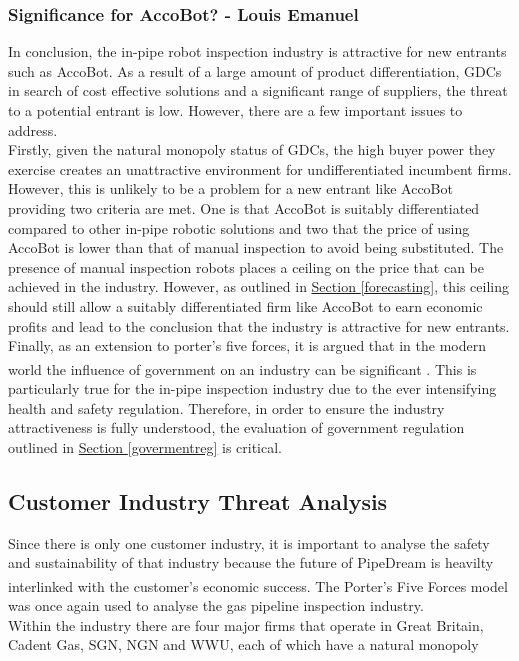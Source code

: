\documentclass[11pt]{article}		%
\newcommand{\supercite}[1]{\textsuperscript{\cite{#1}}}		%
\newcommand{\sectref}[1]{\hyperref[#1]{Section \ref*{#1}}}     %
\begin{document}
			\subsubsection{Significance for AccoBot? - Louis Emanuel}
				In conclusion, the in-pipe robot inspection industry is attractive for new entrants such as AccoBot. As a result of a large amount of product differentiation, GDCs in search of cost effective solutions and a significant range of suppliers, the threat to a potential entrant is low. However, there are a few important issues to address. \\
				\hspace*{3ex}Firstly, given the natural monopoly status of GDCs, the high buyer power they exercise creates an unattractive environment for undifferentiated incumbent firms. However, this is unlikely to be a problem for a new entrant like AccoBot providing two criteria are met. One is that AccoBot is suitably differentiated compared to other in-pipe robotic solutions and two that the price of using AccoBot is lower than that of manual inspection to avoid being substituted. The presence of manual inspection robots places a ceiling on the price that can be achieved in the industry. However, as outlined in \sectref{forecasting}, this ceiling should still allow a suitably differentiated firm like AccoBot to earn economic profits and lead to the conclusion that the industry is attractive for new entrants. \\
				Finally, as an extension to porter's five forces, it is argued that in the modern world the influence of government on an industry can be significant \supercite{GovHBR}. This is particularly true for the in-pipe inspection industry due to the ever intensifying health and safety regulation. Therefore, in order to ensure the industry attractiveness is fully understood, the evaluation of government regulation outlined in \sectref{govermentreg} is critical. 
				
				
				
				
	\subsection{Customer Industry Threat Analysis}
Since there is only one customer industry, it is important to analyse the safety and sustainability of that industry because the future of PipeDream is heavilty interlinked with the customer's economic success.
		The Porter's Five Forces model\supercite{porter2008five} was once again used to analyse the gas pipeline inspection industry.
		\\ \hspace*{3ex}
		Within the industry there are four major firms that operate in Great Britain, Cadent Gas, SGN, NGN and WWU, each of which have a natural monopoly
		
\end{document}
